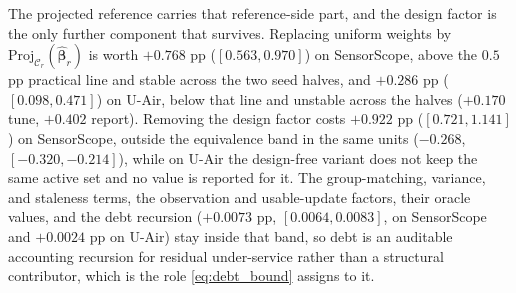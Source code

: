 \documentclass[letterpaper,journal]{IEEEtran}
\begin{document}
The projected reference carries that reference-side part, and the design factor
is the only further component that survives.  Replacing uniform weights by
$\mathrm{Proj}_{\mathcal{C}_r}(\widehat{\boldsymbol\beta}_r)$ is worth $+0.768$ pp
($[0.563,0.970]$) on SensorScope, above the $0.5$ pp practical line and stable
across the two seed halves, and $+0.286$ pp ($[0.098,0.471]$) on U-Air, below
that line and unstable across the halves ($+0.170$ tune, $+0.402$ report).
Removing the design factor costs $+0.922$ pp ($[0.721,1.141]$) on SensorScope,
outside the equivalence band in the same units ($-0.268$, $[-0.320,-0.214]$),
while on U-Air the design-free variant does not keep the same active set and no
value is reported for it.  The group-matching, variance, and staleness terms, the
observation and usable-update factors, their oracle values, and the debt
recursion ($+0.0073$ pp, $[0.0064,0.0083]$, on SensorScope and $+0.0024$ pp on
U-Air) stay inside that band, so debt is an auditable accounting recursion for
residual under-service rather than a structural contributor, which is the role
\eqref{eq:debt_bound} assigns to it.
\end{document}
